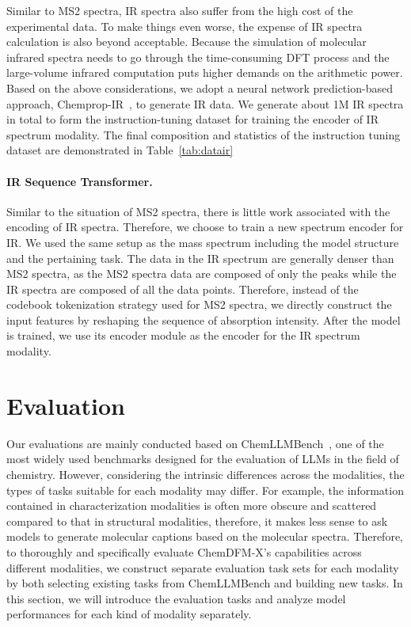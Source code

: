 Similar to MS2 spectra, IR spectra also suffer from the high cost of the experimental data. To make things even worse, the expense of IR spectra calculation is also beyond acceptable. Because the simulation of molecular infrared spectra needs to go through the time-consuming DFT process and the large-volume infrared computation puts higher demands on the arithmetic power. Based on the above considerations, we adopt a neural network prediction-based approach, Chemprop-IR~\cite{Chemprop-IR}, to generate IR data. We generate about 1M IR spectra in total to form the instruction-tuning dataset for training the encoder of IR spectrum modality. The final composition and statistics of the instruction tuning dataset are demonstrated in Table~\ref{tab:datair}

\paragraph{IR Sequence Transformer.}

Similar to the situation of MS2 spectra, there is little work associated with the encoding of IR spectra. Therefore, we choose to train a new spectrum encoder for IR. We used the same setup as the mass spectrum including the model structure and the pertaining task. The data in the IR spectrum are generally denser than MS2 spectra, as the MS2 spectra data are composed of only the peaks while the IR spectra are composed of all the data points. Therefore, instead of the codebook tokenization strategy used for MS2 spectra, we directly construct the input features by reshaping the sequence of absorption intensity. After the model is trained, we use its encoder module as the encoder for the IR spectrum modality.

\section{Evaluation}

Our evaluations are mainly conducted based on ChemLLMBench~\cite{guo2023what}, one of the most widely used benchmarks designed for the evaluation of LLMs in the field of chemistry. However, considering the intrinsic differences across the modalities, the types of tasks suitable for each modality may differ. For example, the information contained in characterization modalities is often more obscure and scattered compared to that in structural modalities, therefore, it makes less sense to ask models to generate molecular captions based on the molecular spectra. Therefore, to thoroughly and specifically evaluate ChemDFM-X's capabilities across different modalities, we construct separate evaluation task sets for each modality by both selecting existing tasks from ChemLLMBench and building new tasks. In this section, we will introduce the evaluation tasks and analyze model performances for each kind of modality separately.

